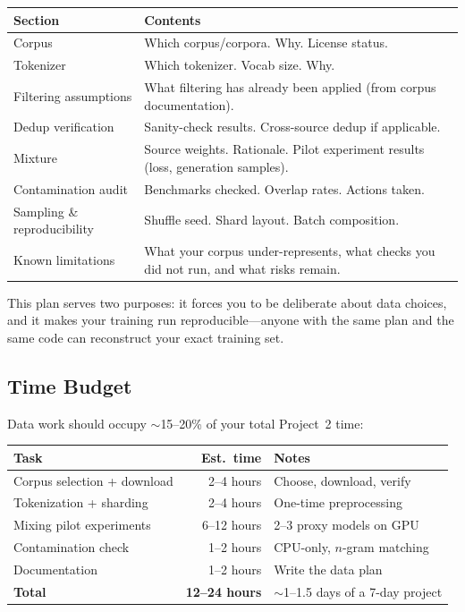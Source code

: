 \begin{center}
\begin{tabularx}{\textwidth}{@{}lX@{}}
\toprule
\textbf{Section} & \textbf{Contents} \\
\midrule
Corpus & Which corpus/corpora. Why. License status. \\
Tokenizer & Which tokenizer. Vocab size. Why. \\
Filtering assumptions & What filtering has already been applied (from corpus documentation). \\
Dedup verification & Sanity-check results. Cross-source dedup if applicable. \\
Mixture & Source weights. Rationale. Pilot experiment results (loss, generation samples). \\
Contamination audit & Benchmarks checked. Overlap rates. Actions taken. \\
Sampling \& reproducibility & Shuffle seed. Shard layout. Batch composition. \\
Known limitations & What your corpus under-represents, what checks you did not run, and what risks remain. \\
\bottomrule
\end{tabularx}
\end{center}

This plan serves two purposes: it forces you to be deliberate about data choices, and it makes your training run reproducible---anyone with the same plan and the same code can reconstruct your exact training set.

\subsection{Time Budget}

Data work should occupy $\sim$15--20\% of your total Project~2 time:

\begin{center}
\begin{tabularx}{\textwidth}{@{}lrX@{}}
\toprule
\textbf{Task} & \textbf{Est.\ time} & \textbf{Notes} \\
\midrule
Corpus selection + download & 2--4 hours & Choose, download, verify \\
Tokenization + sharding & 2--4 hours & One-time preprocessing \\
Mixing pilot experiments & 6--12 hours & 2--3 proxy models on GPU \\
Contamination check & 1--2 hours & CPU-only, $n$-gram matching \\
Documentation & 1--2 hours & Write the data plan \\
\midrule
\textbf{Total} & \textbf{12--24 hours} & $\sim$1--1.5 days of a 7-day project \\
\bottomrule
\end{tabularx}
\end{center}

